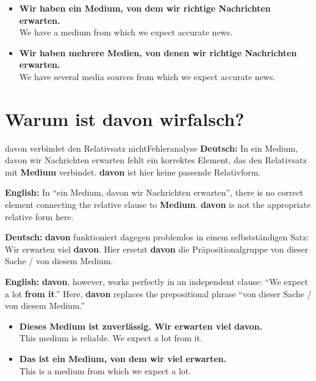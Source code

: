 \documentclass[a4paper,11pt]{article}
\newcommand{\GermanText}[1]{\textbf{Deutsch: }#1\par}
\newcommand{\EnglishText}[1]{{\small\color{SoftGray}\textbf{English: }#1\par}}
\newcommand{\ExampleItem}[2]{\item \textbf{#1}\\{\small\color{SoftGray}#2}}
\begin{document}
        \begin{exbox}
            \begin{itemize}
                \ExampleItem{Wir haben ein Medium, von dem wir richtige Nachrichten erwarten.}{We have a medium from which we expect accurate news.}
                \ExampleItem{Wir haben mehrere Medien, von denen wir richtige Nachrichten erwarten.}{We have several media sources from which we expect accurate news.}
            \end{itemize}
        \end{exbox}

    \section{Warum ist \glqq davon wir\grqq falsch?}

        \begin{grammarentry}{davon verbindet den Relativsatz nicht}{Fehleranalyse}
            \GermanText{In \glqq ein Medium, davon wir Nachrichten erwarten\grqq{} fehlt ein korrektes Element, das den Relativsatz mit \textbf{Medium} verbindet. \textbf{davon} ist hier keine passende Relativform.}
            \EnglishText{In ``ein Medium, davon wir Nachrichten erwarten'', there is no correct element connecting the relative clause to \textbf{Medium}. \textbf{davon} is not the appropriate relative form here.}

            \GermanText{\textbf{davon} funktioniert dagegen problemlos in einem selbstständigen Satz: \glqq Wir erwarten viel \textbf{davon}.\grqq{} Hier ersetzt \textbf{davon} die Präpositionalgruppe \glqq von dieser Sache / von diesem Medium\grqq.}
            \EnglishText{\textbf{davon}, however, works perfectly in an independent clause: ``We expect a lot \textbf{from it}.'' Here, \textbf{davon} replaces the prepositional phrase ``von dieser Sache / von diesem Medium.''}
        \end{grammarentry}

        \begin{exbox}
            \begin{itemize}
                \ExampleItem{Dieses Medium ist zuverlässig. Wir erwarten viel davon.}{This medium is reliable. We expect a lot from it.}
                \ExampleItem{Das ist ein Medium, von dem wir viel erwarten.}{This is a medium from which we expect a lot.}
            \end{itemize}
        \end{exbox}
\end{document}
